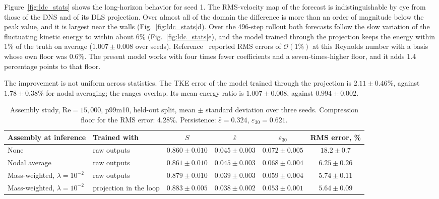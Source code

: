 \documentclass[conf]{new-aiaa}
\newcommand{\Rey}{\mathrm{Re}}
\begin{document}
Figure~\ref{fig:ldc_stats} shows the long-horizon behavior for seed 1. The RMS-velocity map of the forecast is indistinguishable by eye from those of the DNS and of its DLS projection. Over almost all of the domain the difference is more than an order of magnitude below the peak value, and it is largest near the walls (Fig.~\ref{fig:ldc_stats}d). Over the 496-step rollout both forecasts follow the slow variation of the fluctuating kinetic energy to within about 6\% (Fig.~\ref{fig:ldc_stats}e), and the model trained through the projection keeps the energy within 1\% of the truth on average ($1.007\pm0.008$ over seeds). Reference~\cite{morton2026scitech} reported RMS errors of $\mathcal{O}(1\%)$ at this Reynolds number with a basis whose own floor was 0.6\%. The present model works with four times fewer coefficients and a seven-times-higher floor, and it adds 1.4 percentage points to that floor.

The improvement is not uniform across statistics. The TKE error of the model trained through the projection is $2.11\pm0.46$\%, against $1.78\pm0.38$\% for nodal averaging; the ranges overlap. Its mean energy ratio is $1.007\pm0.008$, against $0.994\pm0.002$.

\begin{table}[!tbp]
  \centering
  \small
  \caption{Assembly study, $\Rey=15{,}000$, p99m10, held-out split, mean $\pm$ standard deviation over three seeds. Compression floor for the RMS error: 4.28\%. Persistence: $\bar\varepsilon=0.324$, $\varepsilon_{30}=0.621$.}
  \label{tab:assembly}
  \begin{tabular}{llcccc}
    \toprule
    Assembly at inference & Trained with & $S$ & $\bar\varepsilon$ & $\varepsilon_{30}$ & RMS error, \% \\
    \midrule
    None & raw outputs & $0.860\pm0.010$ & $0.045\pm0.003$ & $0.072\pm0.005$ & $18.2\pm0.7$ \\
    Nodal average & raw outputs & $0.861\pm0.010$ & $0.045\pm0.003$ & $0.068\pm0.004$ & $6.25\pm0.26$ \\
    Mass-weighted, $\lambda=10^{-2}$ & raw outputs & $0.879\pm0.010$ & $0.039\pm0.003$ & $0.059\pm0.004$ & $5.74\pm0.11$ \\
    Mass-weighted, $\lambda=10^{-2}$ & projection in the loop & $0.883\pm0.005$ & $0.038\pm0.002$ & $0.053\pm0.001$ & $5.64\pm0.09$ \\
    \bottomrule
  \end{tabular}
\end{table}
\end{document}

